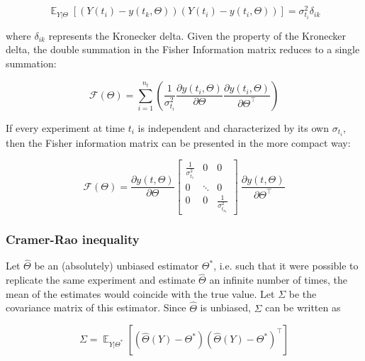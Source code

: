 \documentclass[../Article_Design_of_Experiment.tex]{subfiles}
\begin{document}
	{\footnotesize
	\begin{equation}
		\mathop{\mathbb{E}}_{Y|\Theta} \left[ \left( Y(t_i) - y(t_k, \Theta) \right) \left( Y(t_i) - y(t_i, \Theta) \right) \right] = \sigma_{t_i}^2 \delta_{ik}
	\end{equation} }
	
	where $\delta_{ik}$ represents the Kronecker delta. Given the property of the Kronecker delta, the double summation in the Fisher Information matrix reduces to a single summation:
	
	{\footnotesize
	\begin{equation}
		\mathcal{F}(\Theta) = \sum_{i=1}^{n_t} \left( \frac{1}{\sigma_{t_i}^2} \frac{\partial y(t_i, \Theta)}{\partial \Theta} \frac{\partial y(t_i, \Theta)}{\partial \Theta^\top} \right)
	\end{equation} }
	
	If every experiment at time $t_i$ is independent and characterized by its own $\sigma_{t_i}$, then the Fisher information matrix can be presented in the more compact way:
	
	{\footnotesize
	\begin{equation}
		\mathcal{F}(\Theta) = \frac{\partial y(t, \Theta)}{\partial \Theta} \begin{bmatrix}
			\frac{1}{\sigma_{t_1}^2} & 0 & 0\\
			0 & \ddots & 0 \\
			0 & 0 & \frac{1}{\sigma_{t_{n_t}}^2} 
		\end{bmatrix}\ \frac{\partial y(t, \Theta)}{\partial \Theta^\top} 
	\end{equation} }
	
	\subsubsection{Cramer-Rao inequality}
	
	Let $\hat{\Theta}$ be an (absolutely) unbiased estimator $\Theta^*$, i.e. such that it were possible to replicate the same experiment and estimate $\hat{\Theta}$ an infinite number of times, the mean of the estimates would coincide with the true value. Let $\Sigma$ be the covariance matrix of this estimator. Since $\hat{\Theta}$ is unbiased, $\Sigma$ can be written as
	
	{\footnotesize
	\begin{equation}
		\Sigma = \mathop{\mathbb{E}}_{Y|\Theta^*} \left[ \left( \hat{\Theta}(Y) - \Theta^* \right) \left( \hat{\Theta}(Y) - \Theta^* \right)^\top \right]
	\end{equation} }
	
\end{document}
